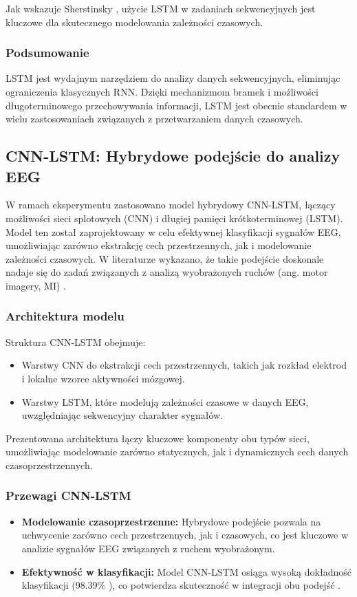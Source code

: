 \documentclass[eeg_v4.tex]{subfiles}
\begin{document}
    Jak wskazuje Sherstinsky \cite{sherstinsky2020}
    , użycie LSTM w zadaniach sekwencyjnych jest kluczowe dla skutecznego modelowania zależności czasowych.

    \subsubsection{Podsumowanie}
    LSTM jest wydajnym narzędziem do analizy danych sekwencyjnych, eliminując ograniczenia klasycznych RNN. Dzięki
    mechanizmom bramek i możliwości długoterminowego przechowywania informacji, LSTM jest obecnie standardem w wielu
    zastosowaniach związanych z przetwarzaniem danych czasowych.

    \subsection{CNN-LSTM: Hybrydowe podejście do analizy EEG}

    W ramach eksperymentu zastosowano model hybrydowy CNN-LSTM, łączący możliwości sieci splotowych (CNN) i długiej
    pamięci krótkoterminowej (LSTM). Model ten został zaprojektowany w celu efektywnej klasyfikacji sygnałów EEG,
    umożliwiając zarówno ekstrakcję cech przestrzennych, jak i modelowanie zależności czasowych. W literaturze wykazano,
    że takie podejście doskonale nadaje się do zadań związanych z analizą wyobrażonych ruchów (ang. motor imagery, MI)
    \cite{boutarfaia2023}.

    \subsubsection{Architektura modelu}
    Struktura CNN-LSTM obejmuje:
    \begin{itemize}
        \item
        Warstwy CNN do ekstrakcji cech przestrzennych, takich jak rozkład elektrod i lokalne wzorce aktywności mózgowej.
        \item
        Warstwy LSTM, które modelują zależności czasowe w danych EEG, uwzględniając sekwencyjny charakter sygnałów.
    \end{itemize}

    Prezentowana architektura łączy kluczowe komponenty obu typów sieci, umożliwiając modelowanie zarówno statycznych,
    jak i dynamicznych cech danych czasoprzestrzennych.

    \subsubsection{Przewagi CNN-LSTM}
    \begin{itemize}
        \item \textbf{Modelowanie czasoprzestrzenne:}
        Hybrydowe podejście pozwala na uchwycenie zarówno cech przestrzennych, jak i czasowych, co jest kluczowe w
        analizie sygnałów EEG związanych z ruchem wyobrażonym.
        \item \textbf{Efektywność w klasyfikacji:} Model CNN-LSTM osiąga wysoką dokładność klasyfikacji (98.39\%
        ), co potwierdza skuteczność w integracji obu podejść \cite{boutarfaia2023}.
    \end{itemize}
\end{document}
